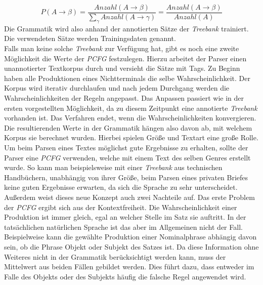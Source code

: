 \begin{equation}
P(A \to \beta) = \frac{Anzahl(A \to \beta)}{ \sum_{\gamma} Anzahl(A \to \gamma)} = \frac{Anzahl(A \to \beta)}{Anzahl(A)}
\end{equation}
Die Grammatik wird also anhand der annotierten Sätze der \textit{Treebank} trainiert. Die verwendeten Sätze werden Trainingsdaten genannt. \\
Falls man keine solche \textit{Treebank} zur Verfügung hat, gibt es noch eine zweite Möglichkeit die Werte der \textit{PCFG} festzulegen. Hierzu arbeitet der Parser einen unannotierter Textkorpus durch und versieht die Sätze mit Tags. Zu Beginn haben alle Produktionen eines Nichtterminals die selbe Wahrscheinlichkeit. Der Korpus wird iterativ durchlaufen und nach jedem Durchgang werden die Wahrscheinlichkeiten der Regeln angepasst. Das Anpassen passiert wie in der ersten vorgestellten Möglichkeit, da zu diesem Zeitpunkt eine annotierte \textit{Treebank} vorhanden ist. Das Verfahren endet, wenn die Wahrscheinlichkeiten konvergieren. \\
Die resultierenden Werte in der Grammatik hängen also davon ab, mit welchem Korpus sie berechnet wurden. Hierbei spielen Größe und Textart eine große Rolle. Um beim Parsen eines Textes möglichst gute Ergebnisse zu erhalten, sollte der Parser eine \textit{PCFG} verwenden, welche mit einem Text des selben Genres erstellt wurde. So kann man beispielsweise mit einer \textit{Treebank} aus technischen Handbüchern, unabhängig von ihrer Größe, beim Parsen eines privaten Briefes keine guten Ergebnisse erwarten, da sich die Sprache zu sehr unterscheidet.\\ %
Außerdem weist dieses neue Konzept auch zwei Nachteile auf.
Das erste Problem der \textit{PCFG} ergibt sich aus der Kontextfreiheit. Die Wahrscheinlichkeit einer Produktion ist immer gleich, egal an welcher Stelle im Satz sie auftritt. In der tatsächlichen natürlichen Sprache ist das aber im Allgemeinen nicht der Fall. Beispielweise kann die gewählte Produktion einer Nominalphrase abhängig davon sein, ob die Phrase Objekt oder Subjekt des Satzes ist. Da diese Information ohne Weiteres nicht in der Grammatik berücksichtigt werden kann, muss der Mittelwert aus beiden Fällen gebildet werden. Dies führt dazu, dass entweder im Falle des Objekts oder des Subjekts häufig die falsche Regel angewendet wird. \\
